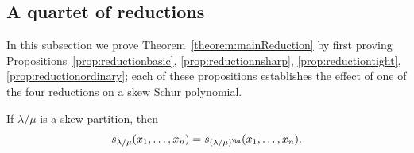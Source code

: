 \subsection{A quartet of reductions}\label{subsec:treductions} In this subsection we prove Theorem~\ref{theorem:mainReduction} by first proving Propositions~\ref{prop:reductionbasic}, \ref{prop:reductionnsharp}, \ref{prop:reductiontight}, \ref{prop:reductionordinary}; each of these propositions establishes the effect of one of the four reductions on a skew Schur polynomial. 

\begin{prop}[{\cite[Lemma 2]{TY10}}]
\label{prop:reductionbasic}
If $\lambda / \mu$ is a skew partition, then 
\[s_{\lambda / \mu}(x_1,\ldots,x_n) = s_{(\lambda / \mu)^\ba }(x_1,\ldots,x_n).
\]
\end{prop}

